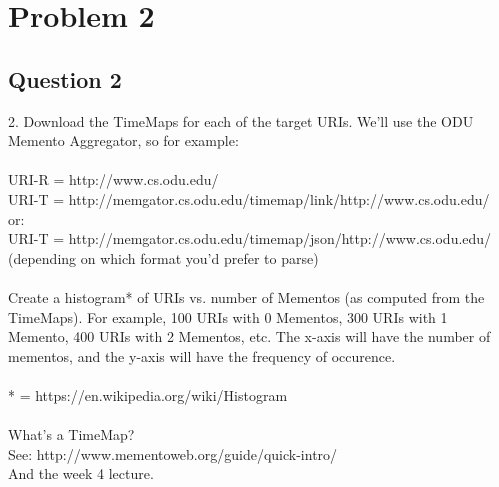 \documentclass[10pt,letterpaper]{article}
\begin{document}
\section{Problem 2}
\subsection{Question 2}
2.  Download the TimeMaps for each of the target URIs.  We'll use the ODU 
Memento Aggregator, so for example:\\
\\
URI-R = http://www.cs.odu.edu/\\
URI-T = http://memgator.cs.odu.edu/timemap/link/http://www.cs.odu.edu/\\
or:\\
URI-T = http://memgator.cs.odu.edu/timemap/json/http://www.cs.odu.edu/\\
(depending on which format you'd prefer to parse)\\
\\
Create a histogram* of URIs vs. number of Mementos (as computed
from the TimeMaps).  For example, 100 URIs with 0 Mementos, 300
URIs with 1 Memento, 400 URIs with 2 Mementos, etc.  The x-axis
will have the number of mementos, and the y-axis will have the
frequency of occurence.\\
\\
* = https://en.wikipedia.org/wiki/Histogram\\
\\
What's a TimeMap?  \\
See: http://www.mementoweb.org/guide/quick-intro/\\
And the week 4 lecture.\\  
\\
\end{document}
